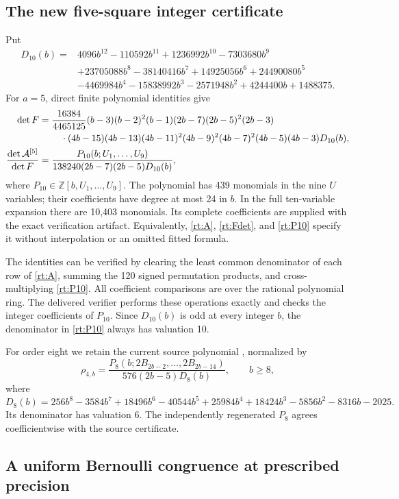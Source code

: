 \subsection{The new five-square integer certificate}

Put
\begin{align*}
 D_{10}(b)={}&4096b^{12}-110592b^{11}+1236992b^{10}-7303680b^9\\
 &+23705088b^8-38140416b^7+14925056b^6+24490080b^5\\
 &-4469984b^4-15838992b^3-2571948b^2+4244400b+1488375.
\end{align*}
For $a=5$, direct finite polynomial identities give
\begin{align}\label{rt:Fdet}
 \det F={}&\frac{16384}{4465125}
 (b-3)(b-2)^2(b-1)(2b-7)(2b-5)^2(2b-3)\notag\\
 &\quad\cdot(4b-15)(4b-13)(4b-11)^2(4b-9)^2(4b-7)^2
 (4b-5)(4b-3)D_{10}(b),\\
 \frac{\det\mathcal A^{[5]}}{\det F}
 ={}&\frac{P_{10}(b;U_1,\ldots,U_9)}
 {138240(2b-7)(2b-5)D_{10}(b)},\label{rt:P10}
\end{align}
where $P_{10}\in\mathbb Z[b,U_1,\ldots,U_9]$. The polynomial has
439 monomials in the nine $U$ variables; their coefficients have
degree at most 24 in $b$. In the full ten-variable expansion there
are 10,403 monomials. Its complete coefficients are supplied with
the exact verification artifact. Equivalently,
\eqref{rt:A}, \eqref{rt:Fdet}, and \eqref{rt:P10} specify it without
interpolation or an omitted fitted formula.

The identities can be verified by clearing the least common denominator
of each row of \eqref{rt:A}, summing the 120 signed permutation
products, and cross-multiplying \eqref{rt:P10}. All coefficient
comparisons are over the rational polynomial ring. The delivered
verifier performs these operations exactly and checks the integer
coefficients of $P_{10}$. Since $D_{10}(b)$ is odd at every integer
$b$, the denominator in \eqref{rt:P10} always has valuation 10.

For order eight we retain the current source polynomial \cite{PRR}, normalized by
\[
 \rho_{4,b}=
 \frac{P_8(b;2B_{2b-2},\ldots,2B_{2b-14})}
 {576(2b-5)D_8(b)},\qquad b\ge8,
\]
where
\[
 D_8(b)=256b^8-3584b^7+18496b^6-40544b^5+25984b^4
       +18424b^3-5856b^2-8316b-2025.
\]
Its denominator has valuation 6. The independently regenerated
$P_8$ agrees coefficientwise with the source certificate.

\subsection{A uniform Bernoulli congruence at prescribed precision}


